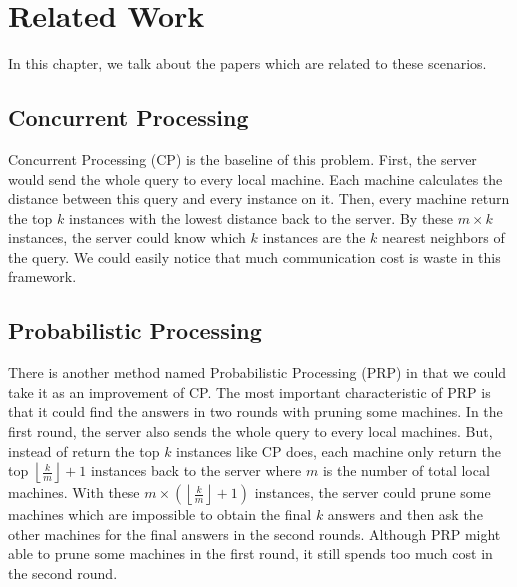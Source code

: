 \chapter{Related Work}
\label{c:related}

In this chapter, we talk about the papers which are related to these scenarios. \\

\section{Concurrent Processing} %
\label{s:concurrent_processing}
Concurrent Processing (CP) \cite{PRP} is the baseline of this problem.  First, the server would send the whole query to every local machine.  Each machine calculates the distance between this query and every instance on it.  Then, every machine return the top $k$ instances with the lowest distance back to the server.  By these $m\times k$ instances, the server could know which $k$ instances are the $k$ nearest neighbors of the query.  We could easily notice that much communication cost is waste in this framework.

\section{Probabilistic Processing} %
\label{s:probabilistic_processing}
\providecommand{\myfloor}[1]{\left \lfloor #1 \right \rfloor }
There is another method named Probabilistic Processing (PRP) in \cite{PRP} that we could take it as an improvement of CP. The most important characteristic of PRP is that it could find the answers in two rounds with pruning some machines.  In the first round, the server also sends the whole query to every local machines.  But, instead of return the top $k$ instances like CP does, each machine only return the top $\myfloor{\frac{k}{m}}+1$ instances back to the server where $m$ is the number of total local machines.  With these $m \times(\myfloor{\frac{k}{m}}+1)$ instances, the server could prune some machines which are impossible to obtain the final $k$ answers and then ask the other machines for the final answers in the second rounds.  Although PRP might able to prune some machines in the first round, it still spends too much cost in the second round.


